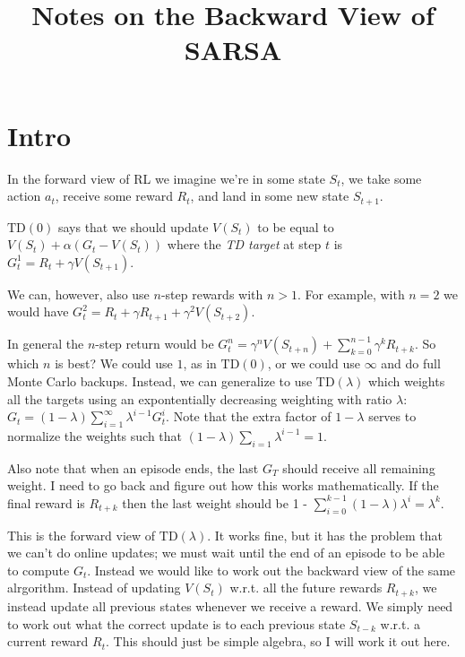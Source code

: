 \documentclass[11pt]{article}
\begin{document}
\title{Notes on the Backward View of SARSA}

\author{}

\maketitle

\section{Intro}
In the forward view of RL we imagine we're in some state $S_t$, we take some action $a_t$, receive some reward $R_t$,
and land in some new state $S_{t+1}$.

$\text{TD}(0)$ says that we should update $V(S_t)$ to be equal to $V(S_t) + \alpha (G_t - V(S_t))$ where the \emph{TD target}
at step $t$ is $G^1_t = R_t + \gamma V(S_{t+1})$.

We can, however, also use $n$-step rewards with $n>1$. For example, with $n=2$ we would have
$G^2_t = R_t + \gamma R_{t+1} + \gamma^2 V(S_{t+2})$.

In general the $n$-step return would be $G^n_t = \gamma^n V(S_{t+n}) + \sum_{k=0}^{n - 1} \gamma^k R_{t+k}$.
So which $n$ is best? We could use $1$, as in $\text{TD}(0)$, or we could use $\infty$ and do full Monte Carlo backups.
Instead, we can generalize to use $\text{TD}(\lambda)$ which weights all the targets using an expontentially decreasing
weighting with ratio $\lambda$: $G_t = (1-\lambda) \sum_{i=1}^{\infty} \lambda^{i-1}G^i_t$.
Note that the extra factor of $1 - \lambda$ serves to normalize the weights such that $(1 - \lambda) \sum_{i=1} \lambda^{i-1} = 1$.

Also note that when an episode ends, the last $G_T$ should receive all remaining weight.
I need to go back and figure out how this works mathematically.
If the final reward is $R_{t+k}$ then the last weight should be 1 - $\sum_{i=0}^{k - 1} (1 - \lambda) \lambda^i = \lambda^k$.

This is the forward view of $\text{TD}(\lambda)$.
It works fine, but it has the problem that we can't do online updates; we must wait until the end of an episode to be able to compute $G_t$.
Instead we would like to work out the backward view of the same alrgorithm.
Instead of updating $V(S_t)$ w.r.t. all the future rewards $R_{t+k}$,
we instead update all previous states whenever we receive a reward.
We simply need to work out what the correct update is to each previous state $S_{t -k}$ w.r.t. a current reward $R_t$.
This should just be simple algebra, so I will work it out here.
\end{document}
